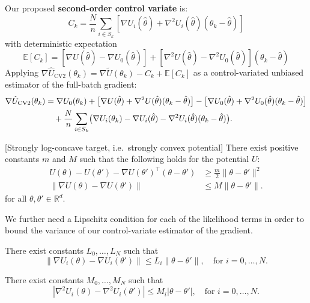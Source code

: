 Our proposed \textbf{second-order control variate} is:
$$C_k = \frac{N}{n}\sum_{i \in S_k} [\nabla U_i(\hat\theta) + \nabla^2 U_i(\hat\theta)(\theta_k - \hat\theta)]$$
with deterministic expectation 
$$\mathbb{E}[C_k] = \left[\nabla U(\hat\theta) - \nabla U_0(\hat\theta)\right] + \left[\nabla^2 U(\hat\theta) - \nabla^2 U_0(\hat\theta)\right](\theta_k - \hat\theta)$$
Applying $\nabla\hat{U}_{\text{CV2}}(\theta_k) = \nabla\tilde{U}(\theta_k) - C_k + \mathbb{E}[C_k]$ as a control-variated unbiased estimator of the full-batch gradient:
\begin{align}
\nabla\hat{U}_{\text{CV2}}(\theta_k) 
    &= \nabla U_0(\theta_k) + \bigl[\nabla U(\hat\theta) 
        + \nabla^2 U(\hat\theta)(\theta_k - \hat\theta)\bigr] - \bigl[\nabla U_0(\hat\theta) 
        + \nabla^2 U_0(\hat\theta)(\theta_k - \hat\theta)\bigr] \notag\\
    &\quad + \frac{N}{n}\sum_{i \in S_k}\bigl(\nabla U_i(\theta_k) 
        - \nabla U_i(\hat\theta) 
        - \nabla^2 U_i(\hat\theta)(\theta_k - \hat\theta)\bigr).
    \label{eq:cv2-theory}
\end{align}
\begin{assumption}\label{ass:convex}[Strongly log-concave target, i.e.\ strongly convex potential]
There exist positive constants $m$ and $M$ such that the following holds for the potential $U$:
\begin{align}
    U(\theta) - U(\theta') - \nabla U(\theta')^\top (\theta - \theta') &\geq \frac{m}{2} \|\theta - \theta'\|^2 \\
    \|\nabla U(\theta) - \nabla U(\theta')\| &\leq M \|\theta - \theta'\|.
\end{align}
for all $\theta, \theta' \in \mathbb{R}^d$.
\end{assumption}
We further need a Lipschitz condition for each of the likelihood terms in order to bound the variance of our control-variate estimator of the gradient.
\begin{assumption}
\label{ass:grad}
    There exist constants $L_0, \ldots, L_N$ such that
\begin{equation}
    \|\nabla U_i(\theta) - \nabla U_i(\theta')\| \leq L_i \|\theta - \theta'\|, 
    \quad \text{for } i = 0, \ldots, N.
\end{equation}
\end{assumption}
\begin{assumption}
\label{ass:hess}
    There exist constants $M_0, \ldots, M_N$ such that
\begin{equation}
|\nabla^2 U_i(\theta) - \nabla^2 U_i(\theta')| \leq M_i |\theta - \theta'|, \quad \text{for } i = 0, \ldots, N.
\end{equation}
\end{assumption}

